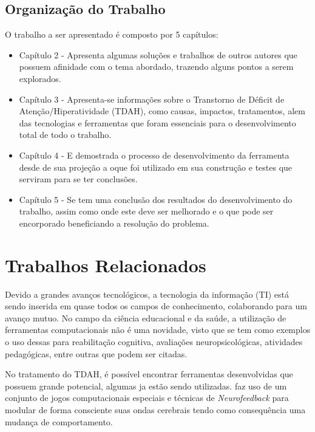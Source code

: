\documentclass[
	12pt,				%
    oneside,			%
	a4paper,			%
	english,			%
	french,				%
	spanish,			%
	brazil,				%
	]{abntex2}
\begin{document}
	\section{Organização do Trabalho}
		O trabalho a ser apresentado é composto por 5 capítulos:
		\begin{itemize}
			
			\item Capítulo 2 - Apresenta algumas soluções e trabalhos de outros autores que possuem afinidade com o tema abordado, trazendo alguns pontos a serem explorados.
			
			\item Capítulo 3 - Apresenta-se informações sobre o Transtorno de Déficit de Atenção/Hiperatividade (TDAH), como causas, impactos, tratamentos, alem das tecnologias e ferramentas que foram essenciais para o desenvolvimento total de todo o trabalho.
			
			\item Capítulo 4 - E demostrada o processo de desenvolvimento da ferramenta desde de sua projeção a oque foi utilizado em sua construção e testes que serviram para se ter conclusões.
			
			\item Capítulo 5 - Se tem uma conclusão dos resultados do desenvolvimento do trabalho, assim como onde este deve ser melhorado e o que pode ser encorporado beneficiando a resolução do problema.
		\end{itemize}




\chapter{Trabalhos Relacionados}

	Devido a grandes avanços tecnológicos, a tecnologia da informação (TI) está sendo inserida em quase todos os campos de conhecimento, colaborando para um avanço mutuo. No campo da ciência educacional e da saúde, a utilização de ferramentas computacionais não é uma novidade, visto que se tem como exemplos o uso dessas para reabilitação cognitiva, avaliações	neuropsicológicas, atividades pedagógicas, entre outras que podem ser citadas.
	
	No tratamento do TDAH, é possível encontrar ferramentas desenvolvidas que possuem grande potencial, algumas ja estão sendo utilizadas.  faz uso de um conjunto de jogos computacionais especiais e técnicas de \textit{Neurofeedback} para modular de forma consciente suas ondas cerebrais tendo como consequência uma mudança de comportamento.
	
\end{document}
